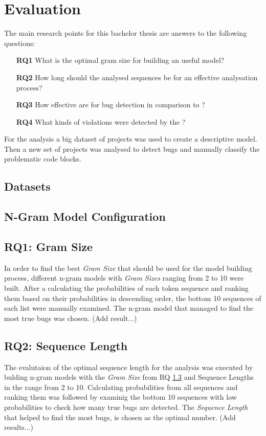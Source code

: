 \chapter{Evaluation}\label{chap:evaluation}
The main research points for this bachelor thesis are answers to the following questions:
\begin{itemize}
\item[\textbf{RQ1}] What is the optimal gram size for building an useful model?
\item[\textbf{RQ2}] How long should the analysed sequences be for an effective analysation process?
\item[\textbf{RQ3}] How effective are \ngram{} for bug detection in comparison to \litterbox{}?
\item[\textbf{RQ4}] What kinds of violations were detected by the \ngram{}?
\end{itemize}
For the analysis a big dataset of  projects was used to create a descriptive model. Then a new set of projects was analysed to detect bugs and manually classify the problematic code blocks.


\section{Datasets}\label{sec:dataset}


\section{N-Gram Model Configuration}\label{sec:ngramconfiguration}


\section{RQ1: Gram Size}\label{sec:gram_size}
In order to find the best \emph{Gram Size} that should be used for the model building process, different n-gram models with \emph{Gram Sizes} ranging from 2 to 10 were built. After a calculating the probabilities of each token sequence and ranking them based on their probabilities in descending order, the bottom 10 sequences of each list were manually examined. The n-gram model that managed to find the most true bugs was chosen. (Add result...)


\section{RQ2: Sequence Length}\label{sec:sequence_length}
The evalutaion of the optimal sequence length for the analysis was executed by bulding n-gram models with the \emph{Gram Size} from RQ \ref{sec:gram_size} and {Sequence Lengths} in the range from 2 to 10. Calculating probabilities from all sequences and ranking them was followed by examinig the bottom 10 sequences with low probabilities to check how many true bugs are detected. The \emph{Sequence Length} that helped to find the most bugs, is chosen as the optimal number. (Add results...)


